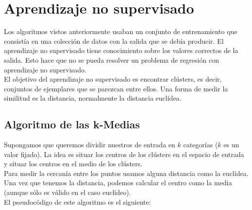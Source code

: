 \section{Aprendizaje no supervisado}

Los algoritmos vistos anteriormente usaban un conjunto de entrenamiento que consistía en una colección de datos con la salida que se debía producir. El aprendizaje no supervisado tiene conocimiento sobre los valores correctos de la salida. Esto hace que no se pueda resolver un problema de regresión con aprendizaje no supervisado.\\

El objetivo del aprendizaje no supervisado es encontrar clústers, es decir, conjuntos de ejemplares que se parezcan entre ellos. Una forma de medir la similitud es la distancia, normalmente la distancia euclídea.

\subsection{Algoritmo de las k-Medias}

Supongamos que queremos dividir nuestros de entrada en $k$ categorías ($k$ es un valor fijado). La idea es situar los centros de los clústers en el espacio de entrada y situar los centros en el medio de los clústers.\\

Para medir la cercanía entre los puntos usamos alguna distancia como la euclídea. Una vez que tenemos la distancia, podemos calcular el centro como la media (aunque sólo es válido en el caso euclídeo).\\

El pseudocódigo de este algoritmo es el siguiente:

